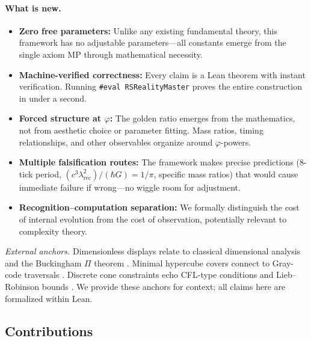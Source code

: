 \documentclass[11pt,a4paper,twoside]{article}
\numberwithin{equation}{section}
\theoremstyle{customthm}
\theoremstyle{customdef}
\theoremstyle{customrem}
\begin{document}
\paragraph{What is new.}
\begin{itemize}
  \item \textbf{Zero free parameters:} Unlike any existing fundamental theory, this framework has no adjustable parameters—all constants emerge from the single axiom MP through mathematical necessity.
  \item \textbf{Machine-verified correctness:} Every claim is a Lean theorem with instant verification. Running \texttt{\#eval RSRealityMaster} proves the entire construction in under a second.
  \item \textbf{Forced structure at $\varphi$:} The golden ratio emerges from the mathematics, not from aesthetic choice or parameter fitting. Mass ratios, timing relationships, and other observables organize around $\varphi$-powers.
  \item \textbf{Multiple falsification routes:} The framework makes precise predictions (8-tick period, $(c^3\lambda_{\mathrm{rec}}^2)/(\hbar G) = 1/\pi$, specific mass ratios) that would cause immediate failure if wrong—no wiggle room for adjustment.
  \item \textbf{Recognition–computation separation:} We formally distinguish the cost of internal evolution from the cost of observation, potentially relevant to complexity theory.
\end{itemize}

\noindent\emph{External anchors.} Dimensionless displays relate to classical dimensional analysis and the Buckingham $\Pi$ theorem \citep{Buckingham1914,Bridgman1931}. Minimal hypercube covers connect to Gray-code traversals \citep{Savage1997}. Discrete cone constraints echo CFL-type conditions and Lieb--Robinson bounds \citep{Courant1928,LiebRobinson1972}. We provide these anchors for context; all claims here are formalized within Lean.

\subsection{Contributions}
\end{document}
